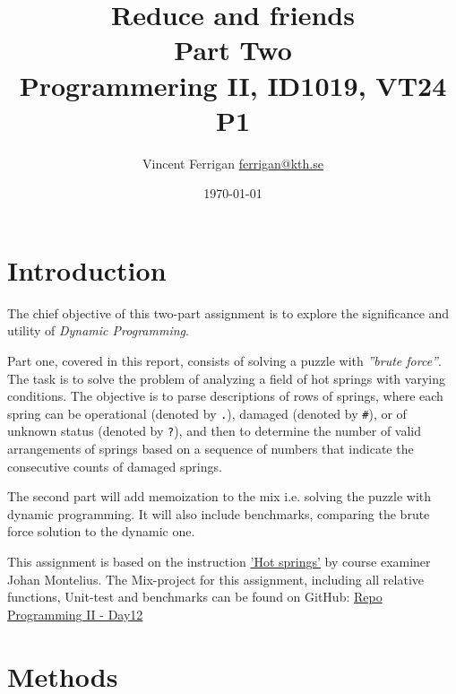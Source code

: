 \documentclass[a4paper,11pt]{article}
\begin{document}
\title{
    Reduce and friends
    \\Part Two
\\\small{Programmering II, ID1019, VT24 P1}
}
\author{Vincent Ferrigan \href{mailto:ferrigan@kth.se}{ferrigan@kth.se}}

 \date{\today}

\maketitle

\section*{Introduction}
\label{sec:introduction}
The chief objective of this two-part assignment is to explore the significance
and utility of \emph{Dynamic Programming}.

Part one, covered in this report, consists of solving a puzzle with
\emph{''brute force''}.
The task is to solve the problem of analyzing a field of
hot springs with varying conditions.
The objective is to parse descriptions of rows of springs,
where each spring can be operational (denoted by \verb|.|),
damaged (denoted by \verb|#|), or of unknown status (denoted by \verb|?|),
and then to determine the number of valid arrangements of springs
based on a sequence of numbers that indicate the consecutive counts of damaged springs.

The second part will add memoization to the mix i.e.
solving the puzzle with dynamic programming.
It will also include benchmarks, comparing the brute force solution to the dynamic one.


This assignment is based on the instruction
\href{https://people.kth.se/~johanmon/courses/id1019/seminars/springs/springs.pdf}{'Hot springs'}
by course examiner Johan Montelius.
The Mix-project for this assignment, including all relative functions, Unit-test and benchmarks can be found on GitHub:
\href{https://github.com/VincentFerrigan/kth-id1019-programming-ii/tree/main/tasks/5/day12}{Repo Programming II - Day12}%

\section*{Methods}
\label{sec:methods}
\end{document}

